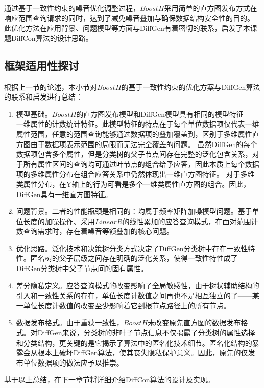 通过基于一致性约束的噪音优化调整过程，$BoostH$采用简单的直方图发布方式在响应范围查询请求的同时，达到了减免噪音叠加与确保数据结构安全性的目的。
此优化方法在应用背景、问题模型等方面与DiffGen有着密切的联系，启发了本课题DiffCon算法的设计思路。


\subsection{框架适用性探讨}

根据上一节的论述，本小节对$BoostH$的基于一致性约束的优化方案与DiffGen算法的联系和启发进行总结：
\begin{enumerate}
	\item 模型基础。$BoostH$的直方图发布模型和DiffGen模型具有相同的模型特征——一维属性的计数统计特征。此模型特征的特点在于每个单位数据项仅代表一维属性范围，任意的范围查询能够通过数据项的叠加覆盖到，区别于多维属性直方图由于数据项表示范围的局限而无法完全覆盖的问题。
	虽然DiffGen的每个数据项包含多个属性，但是分类树的父子节点间存在完整的泛化包含关系，对于所有属性区间的查询均可通过叶节点的组合给予应答，因此本质上每个数据项的多维属性分布在组合应答关系中仍然体现出一维直方图特征。
	对于多维类属性分布，在Y轴上的行为可看是多个一维类属性直方图的组合。因此，DiffGen具有一维直方图特征。
	\item 问题背景。二者的性能瓶颈是相同的：均属于频率矩阵加噪模型问题。基于单位长度的加噪操作、采用$LinearR$的线性累加的应答查询模式，在面对范围计数查询需求时，存在着噪音等额叠加的核心问题。
	\item 优化思路。泛化技术和决策树分类方式决定了DiffGen分类树中存在一致性特性。匿名树的父子层级之间存在明确的泛化关系，使得一致性特性成了DiffGen分类树中父子节点间的固有属性。
	\item 差分隐私定义。应答查询模式的改变影响了全局敏感性，由于树状辅助结构的引入和一致性关系的存在，单位长度计数值之间再也不是相互独立的了——某一单位长度计数值的改变至少影响着它到根节点路径上的所有节点。
	\item 数据发布格式。由于重获一致性，$BoostH$未改变原先直方图的数据发布格式。对DiffGen来说，分类树的非叶子节点信息不仅揭露了分类树的属性选择和分类结构，更关键的是它揭示了算法中的匿名化技术细节。匿名化结构的暴露会从根本上破坏DiffGen算法，使其丧失隐私保护意义。因此，原先的仅发布单位数据项的做法应予以推崇。
	
\end{enumerate}

基于以上总结，在下一章节将详细介绍DiffCon算法的设计及实现。